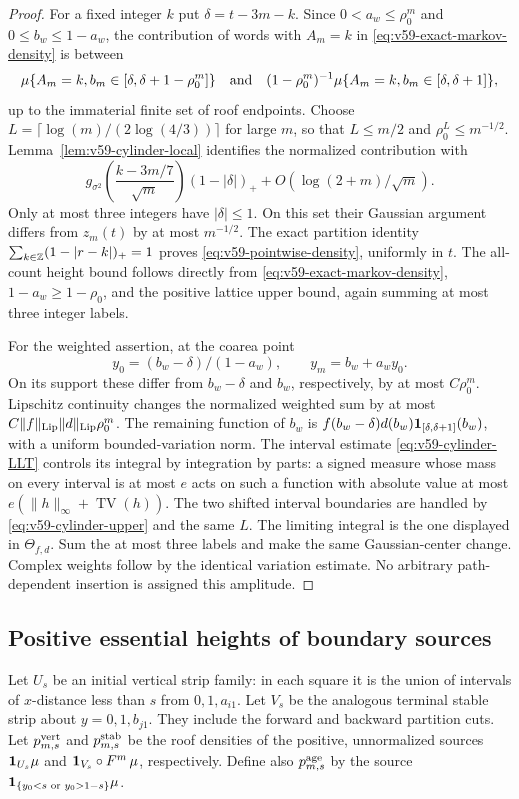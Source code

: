 \begin{proof}
For a fixed integer $k$ put $\delta=t-3m-k$. Since
$0<a_w\le\rho_0^m$ and $0\le b_w\le1-a_w$, the contribution of
words with $A_m=k$ in \eqref{eq:v59-exact-markov-density} is between
\[
 \mu\{A_m=k,b_m\in[\delta,\delta+1-\rho_0^m]\}
 \quad\hbox{and}\quad
 (1-\rho_0^m)^{-1}\mu\{A_m=k,b_m\in[\delta,\delta+1]\},
\]
up to the immaterial finite set of roof endpoints. Choose
$L=\lceil\log(m)/(2\log(4/3))\rceil$ for large $m$, so that
$L\le m/2$ and $\rho_0^L\le m^{-1/2}$.
Lemma~\ref{lem:v59-cylinder-local} identifies the normalized contribution
with
\[
 g_{\sigma^2}\left(\frac{k-3m/7}{\sqrt m}\right)(1-|\delta|)_+
                  +O(\log(2+m)/\sqrt m).
\]
Only at most three integers have $|\delta|\le1$. On this set their
Gaussian argument differs from $z_m(t)$ by at most $m^{-1/2}$.
The exact partition identity
$\sum_{k\in\mathbb Z}(1-|r-k|)_+=1$ proves
\eqref{eq:v59-pointwise-density}, uniformly in $t$. The all-count
height bound follows directly from \eqref{eq:v59-exact-markov-density},
$1-a_w\ge1-\rho_0$, and the positive lattice upper bound, again summing
at most three integer labels.

For the weighted assertion, at the coarea point
\[
 y_0=(b_w-\delta)/(1-a_w),\qquad y_m=b_w+a_wy_0.
\]
On its support these differ from $b_w-\delta$ and $b_w$, respectively,
by at most $C\rho_0^m$. Lipschitz continuity changes the normalized
weighted sum by at most $C\|f\|_{\rm Lip}\|d\|_{\rm Lip}\rho_0^m$.
The remaining function of $b_w$ is
$f(b_w-\delta)d(b_w)\mathbf1_{[\delta,\delta+1]}(b_w)$, with a uniform
bounded-variation norm. The interval estimate
\eqref{eq:v59-cylinder-LLT} controls its integral by integration by
parts: a signed measure whose mass on every interval is at most $e$
acts on such a function with absolute value at most
$e(\|h\|_\infty+\operatorname{TV}(h))$. The two shifted interval
boundaries are handled by \eqref{eq:v59-cylinder-upper} and the same
$L$. The limiting integral is the one displayed in $\Theta_{f,d}$.
Sum the at most three labels and make the same Gaussian-center change.
Complex weights follow by the identical variation estimate. No arbitrary
path-dependent insertion is assigned this amplitude.
\end{proof}

\subsection{Positive essential heights of boundary sources}
Let $U_s$ be an initial vertical strip family: in each square it is the
union of intervals of $x$-distance less than $s$ from $0,1,a_{i1}$.
Let $V_s$ be the analogous terminal stable strip about
$y=0,1,b_{j1}$. They include the forward and backward partition cuts.
Let $p_{m,s}^{\rm vert}$ and $p_{m,s}^{\rm stab}$ be the roof densities
of the positive, unnormalized sources $\mathbf1_{U_s}\mu$ and
$\mathbf1_{V_s}\circ F^m\,\mu$, respectively. Define also
$p_{m,s}^{\rm age}$ by the source $\mathbf1_{\{y_0<s\text{ or }y_0>1-s\}}\mu$.

